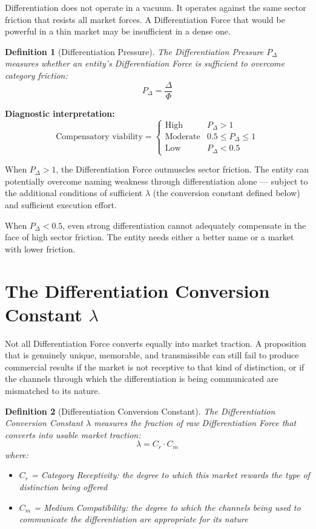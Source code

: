 \documentclass[12pt, openany]{book}
\theoremstyle{thmstyle}
\theoremstyle{defstyle}
\newtheorem{definition}{Definition}[chapter]
\begin{document}
Differentiation does not operate in a vacuum. It operates against the same sector friction that resists all market forces. A Differentiation Force that would be powerful in a thin market may be insufficient in a dense one.

\begin{definition}[Differentiation Pressure]
The Differentiation Pressure $P_\Delta$ measures whether an entity's Differentiation Force is sufficient to overcome category friction:
\begin{equation}
P_\Delta = \frac{\Delta}{\Phi}
\label{eq:diff_pressure}
\end{equation}
\end{definition}

\textbf{Diagnostic interpretation:}
\[
\text{Compensatory viability} =
\begin{cases}
\text{High} & P_\Delta > 1 \\
\text{Moderate} & 0.5 \leq P_\Delta \leq 1 \\
\text{Low} & P_\Delta < 0.5
\end{cases}
\]

When $P_\Delta > 1$, the Differentiation Force outmuscles sector friction. The entity can potentially overcome naming weakness through differentiation alone --- subject to the additional conditions of sufficient $\lambda$ (the conversion constant defined below) and sufficient execution effort.

When $P_\Delta < 0.5$, even strong differentiation cannot adequately compensate in the face of high sector friction. The entity needs either a better name or a market with lower friction.

\section{The Differentiation Conversion Constant $\lambda$}

Not all Differentiation Force converts equally into market traction. A proposition that is genuinely unique, memorable, and transmissible can still fail to produce commercial results if the market is not receptive to that kind of distinction, or if the channels through which the differentiation is being communicated are mismatched to its nature.

\begin{definition}[Differentiation Conversion Constant]
The Differentiation Conversion Constant $\lambda$ measures the fraction of raw Differentiation Force that converts into usable market traction:
\begin{equation}
\lambda = C_r \cdot C_m
\label{eq:lambda}
\end{equation}
where:
\begin{itemize}[leftmargin=1.5em]
  \item $C_r$ = Category Receptivity: the degree to which this market rewards the type of distinction being offered
  \item $C_m$ = Medium Compatibility: the degree to which the channels being used to communicate the differentiation are appropriate for its nature
\end{itemize}
\end{definition}
\end{document}
